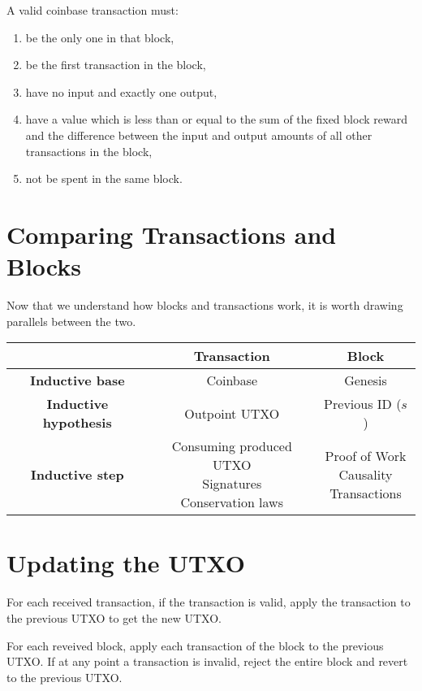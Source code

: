 A valid coinbase transaction must:
\begin{enumerate}
    \item be the only one in that block,
    \item be the first transaction in the block,
    \item have no input and exactly one output,
    \item have a value which is less than or equal to the sum of the fixed block reward and the difference between the input and output amounts of all other transactions in the block,
    \item not be spent in the same block.
\end{enumerate}

\section{Comparing Transactions and Blocks}

Now that we understand how blocks and transactions work, it is worth drawing parallels between the two.
\begin{center}
\begin{tabular}{ |c|c|c| }
  \hline
  & \textbf{Transaction} & \textbf{Block} \\
  \hline
  \textbf{Inductive base} & Coinbase & Genesis \\
  \hline
  \textbf{Inductive hypothesis} & Outpoint UTXO & Previous ID ($s$) \\
  \hline
  \textbf{Inductive step} & \makecell{Consuming produced UTXO \\ Signatures \\ Conservation laws} & \makecell{Proof of Work \\ Causality \\ Transactions} \\
  \hline
\end{tabular}
\end{center}

\section{Updating the UTXO}

For each received transaction, if the transaction is valid, apply the transaction to the previous UTXO to get the new UTXO.

For each reveived block, apply each transaction of the block to the previous UTXO. If at any point a transaction is invalid, reject the entire block and revert to the previous UTXO.

